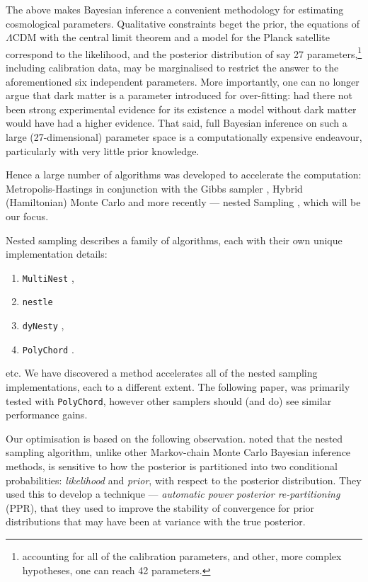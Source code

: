 \documentclass[usenatbib]{mnras}
\begin{document}
The above makes Bayesian inference a convenient methodology for
estimating cosmological parameters. Qualitative constraints beget
the prior, the equations of \(\Lambda\)CDM with the central limit
theorem and a model for the Planck satellite correspond to the
likelihood, and the posterior distribution of say 27
parameters,\footnote{accounting for all of the calibration parameters, and other, more complex hypotheses, one can reach 42 parameters.} including calibration data, may be marginalised to
restrict the answer to the aforementioned six independent
parameters. More importantly, one can no longer argue that dark
matter is a parameter introduced for over-fitting: had there not
been strong experimental evidence for its existence a model without
dark matter would have had a higher evidence. That said, full
Bayesian inference on such a large (27-dimensional) parameter space
is a computationally expensive endeavour, particularly with very
little prior knowledge.

Hence a large number of algorithms was developed to accelerate the
computation: Metropolis-Hastings \citep{Metropolis} in conjunction
with the Gibbs sampler \citep{Metropolis-Hastings-Gibbs}, Hybrid
(Hamiltonian) Monte Carlo \citep{1701.02434,Duane_1987} and more
recently --- nested Sampling \citep{Skilling2006}, which will be our
focus.

Nested sampling \cite{Skilling2006} describes a family of
algorithms, each with their own unique implementation details:
\begin{enumerate}
\item \texttt{MultiNest} \citep{Feroz2009MultiNestAE},
\item \texttt{nestle} \citep{nestle}
\item \texttt{dyNesty} \citep{Speagle_2020},
\item \texttt{PolyChord} \citep{polychord}.
\end{enumerate}
etc. We have discovered a method accelerates all of the nested sampling
implementations, each to a different extent. The following paper,
was primarily tested with \texttt{PolyChord}, however other samplers should
(and do) see similar performance gains.

Our optimisation is based on the following
observation. \cite{chen-ferroz-hobson} noted that the nested sampling
algorithm, unlike other Markov-chain Monte Carlo Bayesian inference
methods, is sensitive to how the posterior is partitioned into two
conditional probabilities: \emph{likelihood} and \emph{prior}, with respect to
the posterior distribution. They used this to develop a technique
--- \emph{automatic power posterior re-partitioning} (PPR), that they
used to improve the stability of convergence for prior distributions
that may have been at variance with the true posterior.
\end{document}
